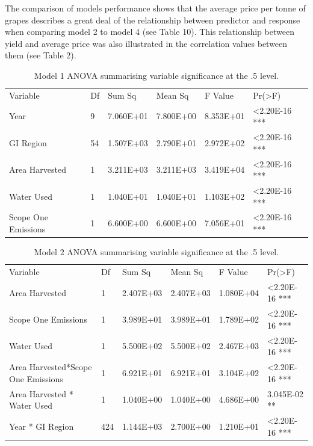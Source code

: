 \documentclass[review,12pt,authoryear]{elsarticle}
\begin{document}
\begin{linenumbers}
The comparison of models performance shows that the average price per tonne of grapes describes a great deal of the relationship between predictor and response when comparing model 2 to model 4 (see Table 10). This relationship between yield and average price was also illustrated in the correlation values between them (see Table 2).

\begin{table}[]
  \label{tab:tab6}
  \caption{Model 1 ANOVA summarising variable significance at the .5 level.}
  \begin{tabular}{llllll}
  Variable            & Df & Sum Sq    & Mean Sq   & F Value   & Pr(\textgreater{}F)    \\
  Year                & 9  & 7.060E+01 & 7.800E+00 & 8.353E+01 & \textless 2.20E-16 *** \\
  GI Region           & 54 & 1.507E+03 & 2.790E+01 & 2.972E+02 & \textless 2.20E-16 *** \\
  Area Harvested      & 1  & 3.211E+03 & 3.211E+03 & 3.419E+04 & \textless 2.20E-16 *** \\
  Water Used          & 1  & 1.040E+01 & 1.040E+01 & 1.103E+02 & \textless 2.20E-16 *** \\
  Scope One Emissions & 1  & 6.600E+00 & 6.600E+00 & 7.056E+01 & \textless 2.20E-16 ***
  \end{tabular}
\end{table}

\begin{table}[]
    \label{tab:tab7}
    \caption{Model 2 ANOVA summarising variable significance at the .5 level.}
    \begin{tabular}{llllll}
    Variable                    & Df  & Sum Sq    & Mean Sq   & F Value   & Pr(\textgreater{}F)    \\
    Area Harvested              & 1   & 2.407E+03 & 2.407E+03 & 1.080E+04 & \textless 2.20E-16 *** \\
    Scope One Emissions         & 1   & 3.989E+01 & 3.989E+01 & 1.789E+02 & \textless 2.20E-16 *** \\
    Water Used                  & 1   & 5.500E+02 & 5.500E+02 & 2.467E+03 & \textless 2.20E-16 *** \\
    Area Harvested*Scope One Emissions & 1 & 6.921E+01 & 6.921E+01 & 3.104E+02 & \textless 2.20E-16 *** \\
    Area Harvested * Water Used & 1   & 1.040E+00 & 1.040E+00 & 4.686E+00 & 3.045E-02 **           \\
    Year * GI Region            & 424 & 1.144E+03 & 2.700E+00 & 1.210E+01 & \textless 2.20E-16 ***
    \end{tabular}
\end{table}


\end{linenumbers}
\end{document}
